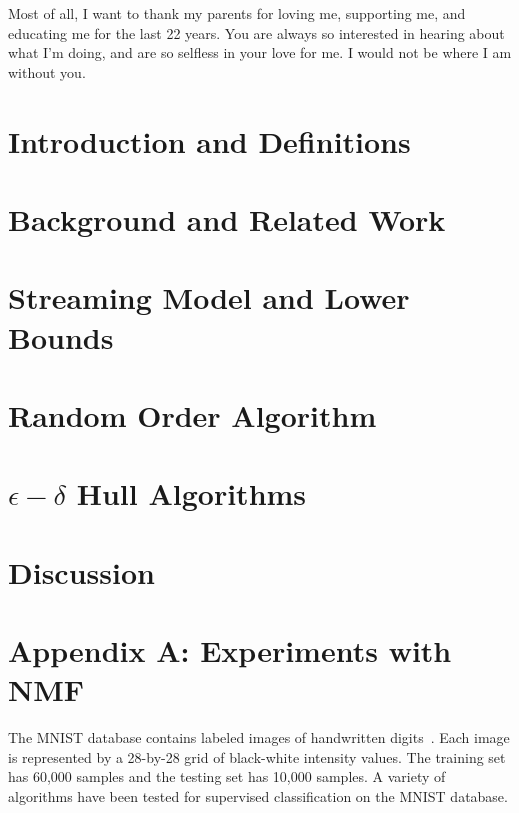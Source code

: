 \documentclass[12pt]{report}
\theoremstyle{definition}
\theoremstyle{lemma}
\theoremstyle{theorem}
\theoremstyle{corollary}
\begin{document}
Most of all, I want to thank my parents for loving me, supporting me, and educating me for the last 22 years. You are always so interested in hearing about what I'm doing, and are so selfless in your love for me. I would not be where I am without you.

\tableofcontents

\chapter{Introduction and Definitions}


\chapter{Background and Related Work}
\label{chapter:related_work}


\chapter{Streaming Model and Lower Bounds}
\label{chapter:lower_bounds}


\chapter{Random Order Algorithm}


\chapter{$\epsilon-\delta$ Hull Algorithms}


\chapter{Discussion}


\chapter*{Appendix A: Experiments with NMF}

The MNIST database contains labeled images of handwritten digits~\cite{lecun}. Each image is represented by a 28-by-28 grid of black-white intensity values. The training set has 60,000 samples and the testing set has 10,000 samples. A variety of algorithms have been tested for supervised classification on the MNIST database.
\\
\end{document}
